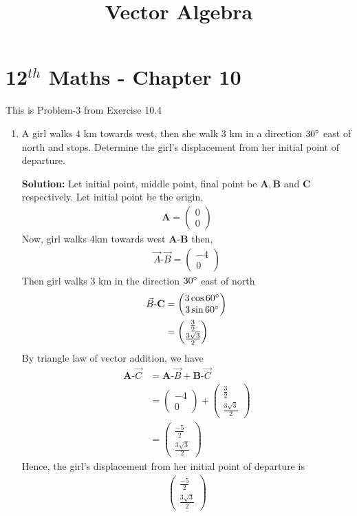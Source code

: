 \documentclass[12pt]{article}
\newcommand{\solution}{\noindent \textbf{Solution: }}
\newcommand{\myvec}[1]{\ensuremath{\begin{pmatrix}#1\end{pmatrix}}}
\let\vec\mathbf
\begin{document}
\begin{center}
\enlargethispage{-4cm}
\title{\textbf{Vector Algebra}}
\date{\vspace{-5ex}} %
\maketitle
\end{center}
\setcounter{page}{1}
\section*{12$^{th}$ Maths - Chapter 10}
This is Problem-3 from Exercise 10.4
\begin{enumerate}
\item A girl walks $4$ km towards west, then she walk $3$ km in a direction $30\degree$ east of north and stops. Determine the girl's displacement from her initial point of departure.

\solution 
		Let initial point, middle point, final point be $\vec{A}, \vec{B}$ and $\vec{C}$ respectively. Let initial point be the origin,  
\begin{align}
	\vec{A}=\myvec{0\\0}
	\end{align}
Now, girl walks $4$km towards west $\vec{A}$-$\vec{B}$ then,
		\begin{align}
			\Vec{A}\text{-}\Vec{B}=\myvec{-4\\0}
\end{align}
Then girl walks 3 km in the direction $30\degree$ east of north
 \begin{align}
	 \Vec{B}\text{-}\vec{C}&=\myvec{3\cos{60\degree}\\3\sin{60\degree}}\\
&=\myvec{\frac{3}{2}\\ \frac{3\sqrt{3}}{2}}
 \end{align}
 By triangle law of vector addition, we have
\begin{align}
	\vec{A}\text{-}\Vec{C} &= \vec{A}\text{-}\Vec{B}+\vec{B}\text{-}\Vec{C}\\
 &=\myvec{-4\\0}+\myvec{\frac{3}{2}\\[2pt] \frac{3\sqrt{3}}{2}}\\
 &=\myvec{\frac{-5}{2}\\[2pt] \frac{3\sqrt{3}}{2}}
\end{align}
  Hence, the girl's displacement from her initial point of departure is 
\begin{align}
\myvec{\frac{-5}{2}\\[2pt] \frac{3\sqrt{3}}{2}}
\end{align}


\end{enumerate}
\end{document}
